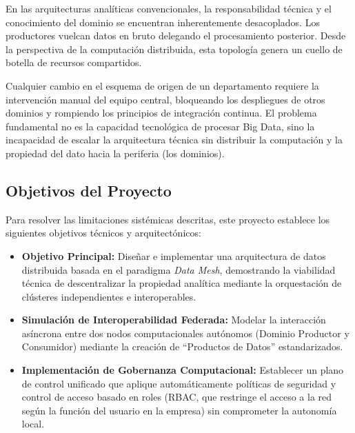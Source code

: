 \documentclass[12pt, a4paper]{article}
\begin{document}
En las arquitecturas analíticas convencionales, la responsabilidad técnica y el conocimiento del dominio se encuentran inherentemente desacoplados. Los productores vuelcan datos en bruto delegando el procesamiento posterior. Desde la perspectiva de la computación distribuida, esta topología genera un cuello de botella de recursos compartidos. 

Cualquier cambio en el esquema de origen de un departamento requiere la intervención manual del equipo central, bloqueando los despliegues de otros dominios y rompiendo los principios de integración continua. El problema fundamental no es la capacidad tecnológica de procesar Big Data, sino la incapacidad de escalar la arquitectura técnica sin distribuir la computación y la propiedad del dato hacia la periferia (los dominios).

\subsection{Objetivos del Proyecto}

Para resolver las limitaciones sistémicas descritas, este proyecto establece los siguientes objetivos técnicos y arquitectónicos:

\begin{itemize}
    \item \textbf{Objetivo Principal:} Diseñar e implementar una arquitectura de datos distribuida basada en el paradigma \textit{Data Mesh}, demostrando la viabilidad técnica de descentralizar la propiedad analítica mediante la orquestación de clústeres independientes e interoperables.
    \item \textbf{Simulación de Interoperabilidad Federada:} Modelar la interacción asíncrona entre dos nodos computacionales autónomos (Dominio Productor y Consumidor) mediante la creación de ``Productos de Datos'' estandarizados.
    \item \textbf{Implementación de Gobernanza Computacional:} Establecer un plano de control unificado que aplique automáticamente políticas de seguridad y control de acceso basado en roles (RBAC, que restringe el acceso a la red según la función del usuario en la empresa) sin comprometer la autonomía local.
\end{itemize}

\end{document}
